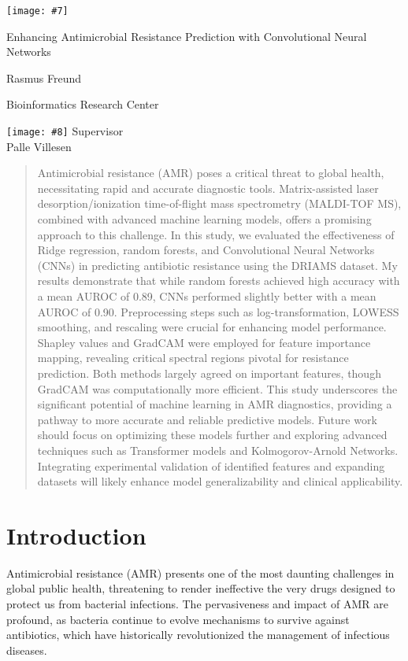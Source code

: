 \documentclass[english,11pt,a4paper,titlepage]{article}
\newcommand{\frontpageBlue}[8]{
	\begin{titlepage}
		\pagecolor{sectioncolor}\afterpage{\nopagecolor}
		\centering
		\texttt{[image: \#7]}\par
		\vspace{1cm}
		{\fontsize{34}{40}\selectfont\color{white}\titlefont #1\par} %
		\vspace{2cm}
		{\color{white}\Large\headingfont #2\par} %
		{\color{white}\large\headingfont #3\par} %
		\vspace{1cm}
		{\color{white}\Large\headingfont #4\par} %
		{\color{white}\large\headingfont #5\par} %
		\vspace{1cm}
		\texttt{[image: \#8]} %
		\vfill
		{\color{white}\Large\headingfont #6}
	\end{titlepage}
}
\newcommand{\frontpageWhite}[8]{
	\begin{titlepage}
		\centering
		\texttt{[image: \#7]}\par
		\vspace{1cm}
		{\fontsize{26}{28}\selectfont\color{sectioncolor}\titlefont #1\par} %
		\vspace{2cm}
		{\Large\headingfont\color{sectioncolor} #2\par} %
		{\large\headingfont\color{sectioncolor} #3\par} %
		\vspace{0.1cm}
		{\Large\headingfont\color{sectioncolor} #4\par} %
		{\large\headingfont\color{sectioncolor} #5\par} %
		\vspace{1cm}
		\texttt{[image: \#8]} %
		\vfill
		{\Large\headingfont\color{sectioncolor} #6}
	\end{titlepage}	
}
\begin{document}
\setlength{\parindent}{25pt} %




\frontpageWhite{Enhancing Antimicrobial Resistance Prediction with Convolutional Neural Networks}{Rasmus Freund}{Bioinformatics Research Center}{}{}{Supervisor\\Palle Villesen}{img/ausegl.png}{img/au_blue.png}


\begin{abstract}
	\noindent %
	Antimicrobial resistance (AMR) poses a critical threat to global health, necessitating rapid and accurate diagnostic tools. Matrix-assisted laser desorption/ionization time-of-flight mass spectrometry (MALDI-TOF MS), combined with advanced machine learning models, offers a promising approach to this challenge. In this study, we evaluated the effectiveness of Ridge regression, random forests, and Convolutional Neural Networks (CNNs) in predicting antibiotic resistance using the DRIAMS dataset. My results demonstrate that while random forests achieved high accuracy with a mean AUROC of 0.89, CNNs performed slightly better with a mean AUROC of 0.90. Preprocessing steps such as log-transformation, LOWESS smoothing, and rescaling were crucial for enhancing model performance. Shapley values and GradCAM were employed for feature importance mapping, revealing critical spectral regions pivotal for resistance prediction. Both methods largely agreed on important features, though GradCAM was computationally more efficient. This study underscores the significant potential of machine learning in AMR diagnostics, providing a pathway to more accurate and reliable predictive models. Future work should focus on optimizing these models further and exploring advanced techniques such as Transformer models and Kolmogorov-Arnold Networks. Integrating experimental validation of identified features and expanding datasets will likely enhance model generalizability and clinical applicability.
\end{abstract}

\captionsetup{font=small}

\section*{Introduction}
Antimicrobial resistance (AMR) presents one of the most daunting challenges in global public health, threatening to render ineffective the very drugs designed to protect us from bacterial infections. The pervasiveness and impact of AMR are profound, as bacteria continue to evolve mechanisms to survive against antibiotics, which have historically revolutionized the management of infectious diseases. 
\end{document}

